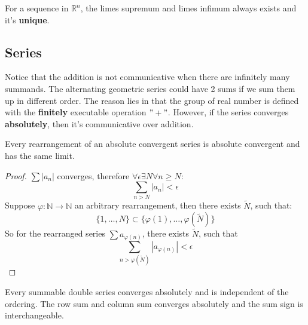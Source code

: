 \begin{definition}
\end{definition}

\begin{theorem}
For a sequence in $\mathbb{R}^n$, the limes supremum and limes infimum always exists and it's \textbf{unique}.
\end{theorem}


\subsection{Series}
Notice that the addition is not communicative when there are infinitely many summands. The alternating geometric series could have 2 sums if we sum them up in different order. The reason lies in that the group of real number is defined with the \textbf{finitely} executable operation $"+"$. However, if the series converges \textbf{absolutely}, then it's communicative over addition.

\begin{theorem}
	Every rearrangement of an absolute convergent series is absolute convergent and has the same limit.
\end{theorem}
\begin{proof}
	$\sum |a_n|$ converges, therefore $\forall \epsilon \exists N \forall
	n \geq N:$
	\begin{equation*}
		\sum_{n > N} |a_n| < \epsilon
	\end{equation*}
	Suppose $\varphi: \mathbb{N} \rightarrow \mathbb{N}$ an arbitrary rearrangement, then there exists $\tilde{N}$, such that:
	\begin{equation*}
		\{1, \dots, N \} \subset \{\varphi(1), \dots, \varphi(\tilde{N})\}
	\end{equation*}
	So for the rearranged series $\sum a_{\varphi(n)}$, there exists $\tilde{N}$, such that
	\begin{equation*}
		\sum_{n > \varphi(\tilde{N})} |a_{\varphi(n)}| < \epsilon
	\end{equation*}
\end{proof}

\begin{theorem}
	Every summable double series converges absolutely and is independent of the ordering. The row sum and column sum converges absolutely and the sum sign is interchangeable.
\end{theorem}


